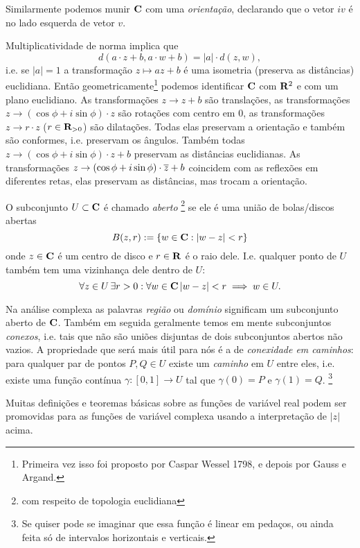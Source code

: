 Similarmente podemos munir $\mathbf{C}$ com uma \emph{orientação},
declarando que o vetor $i v$ é no lado esquerda de vetor $v$.

Multiplicatividade de norma implica que 
\begin{equation}
d(a\cdot z + b,a\cdot w + b) = |a| \cdot d(z,w),
\end{equation}
i.e. se $|a|=1$ a transformação $z\mapsto az+b$
é uma isometria (preserva as distâncias) euclidiana.
Então geometricamente\footnote{Primeira vez isso foi proposto por
Caspar Wessel 1798, e depois por Gauss e Argand.}
podemos identificar $\mathbf{C}$ com $\mathbf{R}^2$ e com um plano euclidiano.
As transformações $z \to z + b$ são translações,
as transformações $z \to (\cos \phi + i \sin \phi) \cdot z$ são rotações com centro em $0$,
as transformações $z \to r \cdot z$ ($r\in\mathbf{R}_{>0}$) são dilatações. 
Todas elas preservam a orientação e também são conformes, i.e. preservam os ângulos.
Também todas $z \to (\cos \phi + i \sin \phi) \cdot z + b$ preservam as distâncias euclidianas.
As transformações $z \to (\cos \phi + i \sin \phi) \cdot \overline{z} + b$ coincidem com as reflexões
em diferentes retas, elas preservam as distâncias, mas trocam a orientação.

O subconjunto $U \subset \mathbf{C}$ é chamado \emph{aberto}
\footnote{com respeito de topologia euclidiana}
se ele é uma união de bolas/discos abertas
\begin{equation}
B(z,r) := \{w\in \mathbf{C} : |w-z|<r \} 
\end{equation}
onde $z\in\mathbf{C}$ é um centro de disco e $r\in\mathbf{R}$ é o raio dele.
I.e. 
qualquer ponto de $U$ também tem uma vizinhança dele dentro de $U$:
\[ \forall z\in U \, \exists r>0 : \forall w\in\mathbf{C} \, |w-z|<r \implies w\in U. \]

Na análise complexa as palavras \emph{região} ou \emph{domínio} significam um subconjunto aberto de $\mathbf{C}$.
Também em seguida geralmente temos em mente subconjuntos \emph{conexos}, i.e. tais
que não são uniões disjuntas de dois subconjuntos abertos não vazios.
A propriedade que será mais útil para nós é a de \emph{conexidade em caminhos}:
para qualquer par de pontos $P,Q\in U$ existe um \emph{caminho} em $U$ entre eles,
i.e. existe uma função contínua $\gamma: [0,1] \to U$ tal que $\gamma(0) = P$
e $\gamma(1)=Q$.
\footnote{Se quiser pode se imaginar que essa função é linear em pedaços,
ou ainda feita só de intervalos horizontais e verticais.}

Muitas definições e teoremas básicas sobre as funções de variável real
podem ser promovidas para as funções de variável complexa usando
a interpretação de $|z|$ acima.


